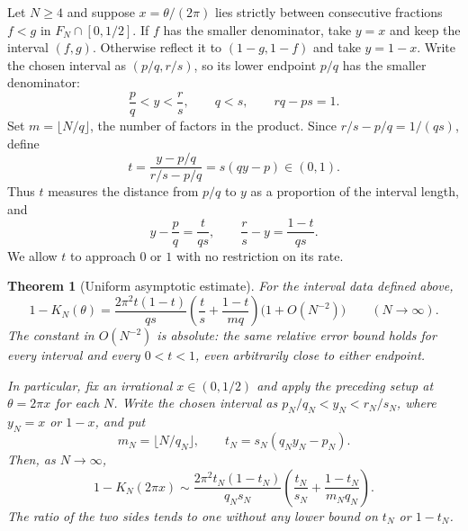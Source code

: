 \documentclass[11pt,a4paper]{article}
\newtheorem{theorem}{Theorem}[section]
\theoremstyle{definition}
\theoremstyle{remark}
\numberwithin{equation}{section}
\begin{document}
Let $N\ge4$ and suppose $x=\theta/(2\pi)$ lies strictly between consecutive fractions $f<g$ in $F_N\cap[0,1/2]$. If $f$ has the smaller denominator, take $y=x$ and keep the interval $(f,g)$. Otherwise reflect it to $(1-g,1-f)$ and take $y=1-x$. Write the chosen interval as $(p/q,r/s)$, so its lower endpoint $p/q$ has the smaller denominator:
\[
 \frac pq<y<\frac rs,\qquad q<s,\qquad rq-ps=1.
\]
Set $m=\lfloor N/q\rfloor$, the number of factors in the product. Since $r/s-p/q=1/(qs)$, define
\[
 t=\frac{y-p/q}{r/s-p/q}=s(qy-p)\in(0,1).
\]
Thus $t$ measures the distance from $p/q$ to $y$ as a proportion of the interval length, and
\[
 y-\frac pq=\frac{t}{qs},\qquad
 \frac rs-y=\frac{1-t}{qs}.
\]
We allow $t$ to approach $0$ or $1$ with no restriction on its rate.

\begin{theorem}[Uniform asymptotic estimate]\label{thm:farey-asymptotic}
For the interval data defined above,
\begin{equation}\label{eq:uniform-farey-asymptotic}
 1-K_N(\theta)=
 \frac{2\pi^2t(1-t)}{qs}
 \left(\frac{t}{s}+\frac{1-t}{mq}\right)
 \bigl(1+O(N^{-2})\bigr)
 \qquad(N\to\infty).
\end{equation}
The constant in $O(N^{-2})$ is absolute: the same relative error bound holds for every interval and every $0<t<1$, even arbitrarily close to either endpoint.

In particular, fix an irrational $x\in(0,1/2)$ and apply the preceding setup at $\theta=2\pi x$ for each $N$. Write the chosen interval as $p_N/q_N<y_N<r_N/s_N$, where $y_N=x$ or $1-x$, and put
\[
 m_N=\lfloor N/q_N\rfloor,\qquad
 t_N=s_N(q_Ny_N-p_N).
\]
Then, as $N\to\infty$,
\[
 1-K_N(2\pi x)\sim
 \frac{2\pi^2t_N(1-t_N)}{q_Ns_N}
 \left(\frac{t_N}{s_N}+\frac{1-t_N}{m_Nq_N}\right).
\]
The ratio of the two sides tends to one without any lower bound on $t_N$ or $1-t_N$.
\end{theorem}
\end{document}
